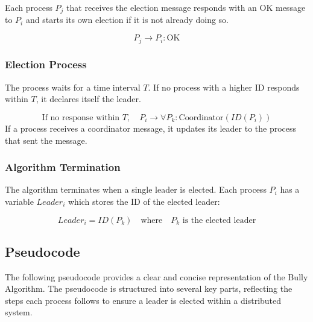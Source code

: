 Each process \(P_j\) that receives the election message responds with an OK message to \(P_i\) and starts its own election if it is not already doing so.

\begin{equation}
P_j \rightarrow P_i: \text{OK}
\end{equation}

\subsubsection{Election Process}

The process waits for a time interval \(T\). If no process with a higher ID responds within \(T\), it declares itself the leader.

\begin{equation}
\text{If no response within } T, \quad P_i \rightarrow \forall P_k: \text{Coordinator}(ID(P_i))
\end{equation}
If a process receives a coordinator message, it updates its leader to the process that sent the message.

\subsubsection{Algorithm Termination}

The algorithm terminates when a single leader is elected. Each process \(P_i\) has a variable \(Leader_i\) which stores the ID of the elected leader:

\begin{equation}
Leader_i = ID(P_k) \quad \text{where} \quad P_k \text{ is the elected leader}
\end{equation}

\subsection{Pseudocode}

The following pseudocode provides a clear and concise representation of the Bully Algorithm. The pseudocode is structured into several key parts, reflecting the steps each process follows to ensure a leader is elected within a distributed system.

